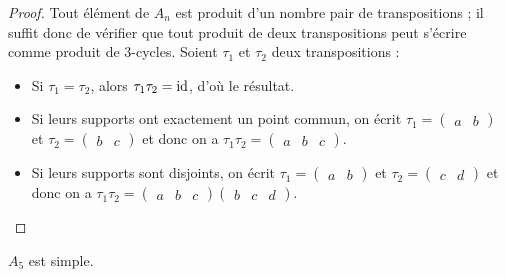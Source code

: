 	\begin{proof}
		Tout élément de $A_n$ est produit d'un nombre pair de transpositions ; il suffit donc de vérifier que tout produit de deux transpositions peut s'écrire comme produit de $3$-cycles. Soient $\tau_1$ et $\tau_2$ deux transpositions :
		\begin{itemize}
			\item Si $\tau_1 = \tau_2$, alors $\tau_1 \tau_2 = \operatorname{id}$, d'où le résultat.
			\item Si leurs supports ont exactement un point commun, on écrit $\tau_1 = \begin{pmatrix} a & b \end{pmatrix}$ et $\tau_2 = \begin{pmatrix} b & c \end{pmatrix}$ et donc on a $\tau_1 \tau_2 =  \begin{pmatrix} a & b & c \end{pmatrix}$.
			\item Si leurs supports sont disjoints, on écrit $\tau_1 = \begin{pmatrix} a & b \end{pmatrix}$ et $\tau_2 = \begin{pmatrix} c & d \end{pmatrix}$ et donc on a $\tau_1 \tau_2 =  \begin{pmatrix} a & b & c \end{pmatrix}\begin{pmatrix} b & c & d \end{pmatrix}$.
		\end{itemize}
	\end{proof}


	\begin{lemma}
		\label{simplicite-du-groupe-alterne-3}
		$A_5$ est simple.
	\end{lemma}

